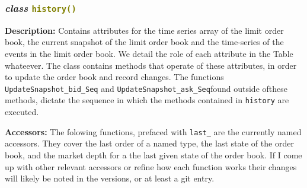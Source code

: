
\subsubsection{\textit{class} \textcolor{olive}{\texttt{history()}}}\hfill \break
\textbf{Description:} Contains attributes for the time series array of the limit order book, the current snapshot of the limit order book and the time-series of the events in the limit order book. We detail the role of each attribute in the Table whateever. The class contains methods that operate of these attributes, in order to update the order book and record changes. The functions \texttt{UpdateSnapshot\_bid\_Seq} and \texttt{UpdateSnapshot\_ask\_Seq}found outside ofthese methods, dictate the sequence in which the methods contained in \texttt{history} are executed.





























\noindent\textbf{Accessors:} The folowing functions, prefaced with \texttt{last\_} are the currently named accessors. They cover the last order of a named type, the last state of the order book, and the market depth for a the last given state of the order book. If I come up with other relevant accessors or refine how each function works their changes will likely be noted in the versions, or at least a git entry. 


